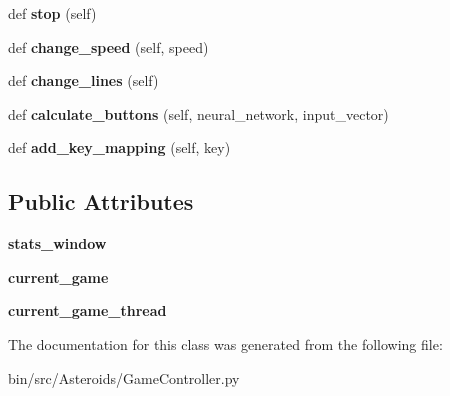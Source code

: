 \begin{DoxyCompactItemize}
\item 
def {\bfseries stop} (self)\hypertarget{classGameController_1_1GameController_adceb4b825410df4ac33c63732c5ebb1c}{}\label{classGameController_1_1GameController_adceb4b825410df4ac33c63732c5ebb1c}

\item 
def {\bfseries change\+\_\+speed} (self, speed)\hypertarget{classGameController_1_1GameController_a6e9c793d9f9c7f91ef86fdfbad1f399c}{}\label{classGameController_1_1GameController_a6e9c793d9f9c7f91ef86fdfbad1f399c}

\item 
def {\bfseries change\+\_\+lines} (self)\hypertarget{classGameController_1_1GameController_a6df31616562721415f855506ac39200e}{}\label{classGameController_1_1GameController_a6df31616562721415f855506ac39200e}

\item 
def {\bfseries calculate\+\_\+buttons} (self, neural\+\_\+network, input\+\_\+vector)\hypertarget{classGameController_1_1GameController_adfa21a1d6a41248487a720c5311eb5c7}{}\label{classGameController_1_1GameController_adfa21a1d6a41248487a720c5311eb5c7}

\item 
def {\bfseries add\+\_\+key\+\_\+mapping} (self, key)\hypertarget{classGameController_1_1GameController_a7828e77aa375bd536fe94f502cf177e5}{}\label{classGameController_1_1GameController_a7828e77aa375bd536fe94f502cf177e5}

\end{DoxyCompactItemize}
\subsection*{Public Attributes}
\begin{DoxyCompactItemize}
\item 
{\bfseries stats\+\_\+window}\hypertarget{classGameController_1_1GameController_a2a1ba0465b97db6b05716e321f778a8d}{}\label{classGameController_1_1GameController_a2a1ba0465b97db6b05716e321f778a8d}

\item 
{\bfseries current\+\_\+game}\hypertarget{classGameController_1_1GameController_aa9126bcbf2b35e3f5216409e8e27451f}{}\label{classGameController_1_1GameController_aa9126bcbf2b35e3f5216409e8e27451f}

\item 
{\bfseries current\+\_\+game\+\_\+thread}\hypertarget{classGameController_1_1GameController_acf065316475a9b63dcd44ddb367acf45}{}\label{classGameController_1_1GameController_acf065316475a9b63dcd44ddb367acf45}

\end{DoxyCompactItemize}


The documentation for this class was generated from the following file\+:\begin{DoxyCompactItemize}
\item 
bin/src/\+Asteroids/Game\+Controller.\+py\end{DoxyCompactItemize}
